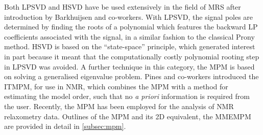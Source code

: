 Both \ac{LPSVD}\cite{Kumaresan1982,Kumaresan1983} and
\ac{HSVD}\cite{Kung1983} have be used extensively in the field of \ac{MRS}
after introduction by Barkhuijsen and
co-workers\cite{Barkhuijsen1985a,Barkhuijsen1985b,Barkhuijsen1987,Beer1988,Pijnappel1992}.
With
\ac{LPSVD}, the signal poles are determined by finding the roots of a
polynomial which features the backward \ac{LP} coefficients associated with the
signal, in a similar fashion to the classical Prony method\cite{Prony1795}.
\ac{HSVD} is based on the ``state-space'' principle, which generated interest
in part because it meant that the computationally costly polynomial rooting
step in \ac{LPSVD} was avoided.
A further technique in this category, the
\ac{MPM}\cite{Hua1990,Hua1990b,Hua1991} is based on solving a generalised
eigenvalue problem.  Pines and co-workers introduced the \ac{ITMPM}\cite{Lin1997},
for use in \ac{NMR}, which combines the \ac{MPM} with a method for estimating
the model order, such that no \textit{a priori} information is required from
the user.  Recently, the \ac{MPM} has been employed for the analysis of
\ac{NMR} relaxometry data\cite{Fricke2020, Wortge2023}.  Outlines of the
\ac{MPM} and its \ac{2D} equivalent, the \ac{MMEMPM}\cite{Hua1992,Chen2007} are
provided in detail in \cref{subsec:mpm}.


